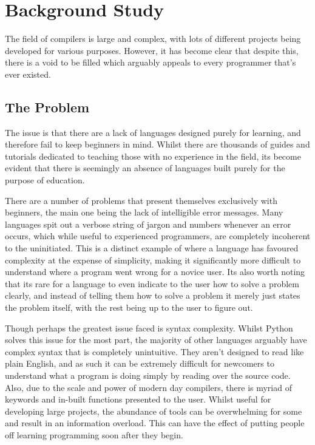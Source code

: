\documentclass[
]{report}
\begin{document}
\chapter{Background Study}
The field of compilers is large and complex, with lots of different
projects being developed for various purposes. However, it has become
clear that despite this, there is a void to be filled which arguably
appeals to every programmer that's ever existed.

\section{The Problem}
The issue is that there are a lack of languages designed purely for
learning, and therefore fail to keep beginners in mind. Whilst there are
thousands of guides and tutorials dedicated to teaching those with no
experience in the field, its become evident that there is seemingly an
absence of languages built purely for the purpose of education.

There are a number of problems that present themselves exclusively with
beginners, the main one being the lack of intelligible error messages.
Many languages spit out a verbose string of jargon and numbers whenever
an error occurs, which while useful to experienced programmers, are
completely incoherent to the uninitiated. This is a distinct example of
where a language has favoured complexity at the expense of simplicity,
making it significantly more difficult to understand where a program
went wrong for a novice user. Its also worth noting that its rare for a
language to even indicate to the user how to solve a problem clearly,
and instead of telling them how to solve a problem it merely just states
the problem itself, with the rest being up to the user to figure out.

Though perhaps the greatest issue faced is syntax complexity. Whilst
Python solves this issue for the most part, the majority of other
languages arguably have complex syntax that is completely unintuitive.
They aren't designed to read like plain English, and as such it can be
extremely difficult for newcomers to understand what a program is doing
simply by reading over the source code. Also, due to the scale and power
of modern day compilers, there is myriad of \glspl{keyword} and in-built
functions presented to the user. Whilst useful for developing large
projects, the abundance of tools can be overwhelming for some and result
in an information overload. This can have the effect of putting people
off learning programming soon after they begin.
\end{document}
